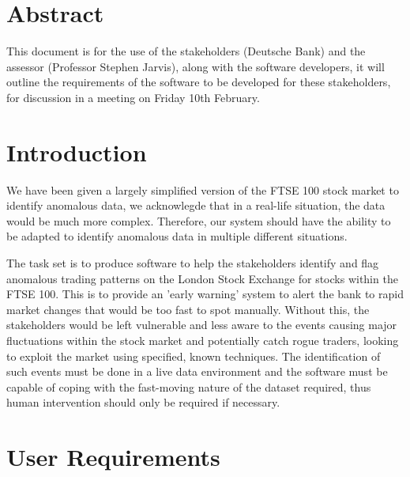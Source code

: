 \documentclass[11pt, oneside, a4paper]{article}
\begin{document}
\clearpage
\maketitle
\thispagestyle{empty}

\newpage
\setcounter{page}{1}

\section{Abstract}
This document is for the use of the stakeholders (Deutsche Bank) and the assessor (Professor Stephen Jarvis),
along with the software developers, it will outline the requirements of the software to be developed for
these stakeholders, for discussion in a meeting on Friday 10th February.

\section{Introduction}
We have been given a largely simplified version of the FTSE 100 stock market to identify anomalous data, we
acknowlegde that in a real-life situation, the data would be much more complex. Therefore, our system should
have the ability to be adapted to identify anomalous data in multiple different situations.

The task set is to produce software to help the stakeholders identify and flag anomalous trading patterns
on the London Stock Exchange for stocks within the FTSE 100. This is to provide an 'early warning' system
to alert the bank to rapid market changes that would be too fast to spot manually. Without this, the
stakeholders would be left vulnerable and less aware to the events causing major fluctuations within the
stock market and potentially catch rogue traders, looking to exploit the market using specified, known
techniques. The identification of such events must be done in a live data environment and the software
must be capable of coping with the fast-moving nature of the dataset required, thus human intervention
should only be required if necessary.

\section{User Requirements}
\end{document}
